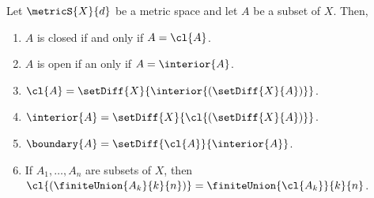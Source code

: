 \begin{Proposition}\label{prop:prop_closure_interior}
    Let $\metricS{X}{d}$ be a metric space and let $A$ be a subset of $X$. Then,
    \begin{enumerate}
	\item
	    $A$ is closed if and only if $A = \cl{A}$.
	\item
	    $A$ is open if an only if $A = \interior{A}$.
	\item
	    $\cl{A} = \setDiff{X}{\interior{(\setDiff{X}{A})}}$.
	\item
	    $\interior{A} = \setDiff{X}{\cl{(\setDiff{X}{A})}}$.
	\item
	    $\boundary{A} = \setDiff{\cl{A}}{\interior{A}}$.
	\item
	    If $A_1,\ldots,A_n$ are subsets of $X$, then $\cl{(\finiteUnion{A_k}{k}{n})} =
	    \finiteUnion{\cl{A_k}}{k}{n}$.
    \end{enumerate}
\end{Proposition}
